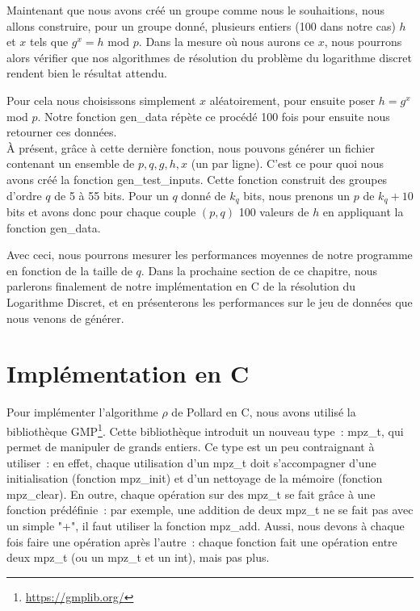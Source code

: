         Maintenant que nous avons créé un groupe comme nous le souhaitions, nous allons construire, pour un groupe donné, plusieurs entiers (100 dans notre cas) $h$ et $x$ tels que $g^x = h$ mod $p$. Dans la mesure où nous aurons ce $x$, nous pourrons alors vérifier que nos algorithmes de résolution du problème du logarithme discret rendent bien le résultat attendu.

        Pour cela nous choisissons simplement $x$ aléatoirement, pour ensuite poser $h = g^x$ mod $p$. Notre fonction gen\_data répète ce procédé 100 fois pour ensuite nous retourner ces données.\\

        À présent, grâce à cette dernière fonction, nous pouvons générer un fichier contenant un ensemble de $p, q, g, h, x$ (un par ligne). C'est ce pour quoi nous avons créé la fonction gen\_test\_inputs. Cette fonction construit des groupes d'ordre $q$ de 5 à 55 bits. Pour un $q$ donné de $k_q$ bits, nous prenons un $p$ de $k_q + 10$ bits et avons donc pour chaque couple $(p,q)$ 100 valeurs de $h$ en appliquant la fonction gen\_data.

        Avec ceci, nous pourrons mesurer les performances moyennes de notre programme en fonction de la taille de $q$. Dans la prochaine section de ce chapitre, nous parlerons finalement de notre implémentation en C de la résolution du Logarithme Discret, et en présenterons les performances sur le jeu de données que nous venons de générer.

        \section{Implémentation en C}
        \label{chapter2:implementation_c}
          Pour implémenter l'algorithme $\rho$ de Pollard en C, nous avons utilisé la bibliothèque GMP\footnote{\url{https://gmplib.org/}}. Cette bibliothèque introduit un nouveau type~: mpz\_t, qui permet de manipuler de grands entiers. Ce type est un peu contraignant à utiliser~: en effet, chaque utilisation d'un mpz\_t doit s'accompagner d'une initialisation (fonction mpz\_init) et d'un nettoyage de la mémoire (fonction mpz\_clear). En outre, chaque opération sur des mpz\_t se fait grâce à une fonction prédéfinie~: par exemple, une addition de deux mpz\_t ne se fait pas avec un simple "+", il faut utiliser la fonction mpz\_add. Aussi, nous devons à chaque fois faire une opération après l'autre~: chaque fonction fait une opération entre deux mpz\_t (ou un mpz\_t et un int), mais pas plus.


